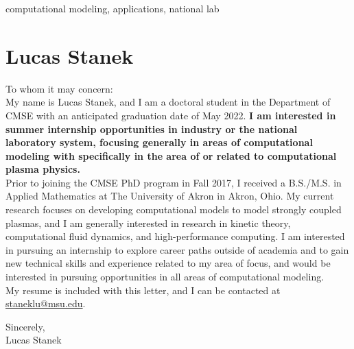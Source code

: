  computational modeling, applications, national lab


\vspace{2em} %

\section{Lucas Stanek}


\label{sec:lucas_stanek} 


\setlength\parindent{0cm}

To whom it may concern:\\

My name is Lucas Stanek, and I am a doctoral student in the Department of CMSE with an anticipated graduation date of May 2022. {\textbf{I am interested in summer internship opportunities in industry or the national laboratory system, focusing generally in areas of computational modeling with specifically in the area of or related to computational plasma physics.}} \\

Prior to joining the CMSE PhD program in Fall 2017, I received a B.S./M.S. in Applied Mathematics at The University of Akron in Akron, Ohio. My current research focuses on developing computational models to model strongly coupled plasmas, and I am generally interested in research in kinetic theory, computational fluid dynamics, and high-performance computing. I am interested in pursuing an internship to explore career paths outside of academia and to gain new technical skills and experience related to my area of focus, and would be interested in pursuing opportunities in all areas of computational modeling.\\

My resume is included with this letter, and I can be contacted at \href{mailto:staneklu@msu.edu}{staneklu@msu.edu}.\\

\begin{flushright}
Sincerely, \\
\vspace{1em} 
\vspace{1em} 
Lucas Stanek\\
\end{flushright}



%  


